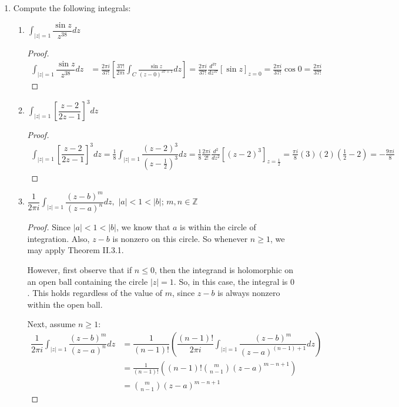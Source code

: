 \documentclass[10pt]{article}
\newcommand{\Z}{\mathbb{Z}}
\newcommand{\R}{\mathbb{R}}
\newcommand{\C}{\mathbb{C}}
\newcommand{\Int}{\displaystyle\int}
\begin{document}
\begin{enumerate}
\begin{proof}
Suppose the range of $f$ is not dense in $\C$.  Then there exist $r \in \R$ and $w \in \C$ such that $|f(z) - w| > r$ for all $z \in \C$.  But then $\frac{1}{f(z) - w}$ is an entire, bounded function (the denominator is always nonzero since $w \not \in f(\C)$, and its modulus is bounded by $r$).  Therefore, $\frac{1}{f(z) - w} = c$ for some nonzero $c \in \C$.  Thus, $f(z) = w + \frac{1}{c}$ is constant.
\end{proof}

\item Compute the following integrals:
\begin{enumerate}
\item $\Int_{|z|=1} \dfrac{\sin z}{z^{38}}dz$
\begin{proof}
\begin{align*}
\Int_{|z|=1} \dfrac{\sin z}{z^{38}}dz
&=
\frac{2\pi i}{37!} \left[ \frac{37!}{2\pi i} \Int_C \frac{\sin z}{(z-0)^{37+1}}dz \right] = \frac{2\pi i}{37!} \frac{d^{37}}{dz^{37}}[\sin z]_{z = 0}
= \frac{2\pi i}{37!} \cos 0 = \frac{2\pi i}{37!}
\end{align*}
\end{proof}
\item $\Int_{|z|=1} \left[ \dfrac{z-2}{2z-1} \right]^3 dz$
\begin{proof}
\begin{align*}
\Int_{|z|=1} \left[ \dfrac{z-2}{2z-1} \right]^3 dz
=
\frac18 \Int_{|z|=1} \dfrac{(z-2)^3}{(z-\frac12)^3} dz
= \frac18 \frac{2\pi i}{2!}\frac{d^2}{dz^2}[(z-2)^3]_{z=\frac12}
= \frac{\pi i}{8}(3)(2)(\frac12 - 2)
= -\frac{9\pi i}{8}
\end{align*}
\end{proof}
\item $\dfrac{1}{2\pi i} \Int_{|z|=1} \dfrac{(z-b)^m}{(z-a)^n}dz,$ $|a|< 1 < |b|$; $m,n \in \Z$
\begin{proof}
Since $|a| < 1 < |b|$, we know that $a$ is within the circle of integration.  Also, $z-b$ is nonzero on this circle.  So whenever $n \geq 1$, we may apply Theorem II.3.1.

However, first observe that if $n \leq 0$, then the integrand is holomorphic on an open ball containing the circle $|z| = 1$.  So, in this case, the integral is $0$.  This holds regardless of the value of $m$, since $z-b$ is always nonzero within the open ball.

Next, assume $n \geq 1$:
\begin{align*}
\dfrac{1}{2\pi i} \Int_{|z|=1} \dfrac{(z-b)^m}{(z-a)^n}dz
&=
\dfrac{1}{(n-1)!}\left(\dfrac{(n-1)!}{2\pi i} \Int_{|z|=1} \dfrac{(z-b)^m}{(z-a)^{(n-1)+1}}dz
\right)
\\
&=
\frac{1}{(n-1)!}\left( (n-1)! \binom{m}{n-1} (z-a)^{m-n+1} \right)
\\
&=
\binom{m}{n-1} (z-a)^{m-n+1}
\end{align*}
\end{proof}
\end{enumerate}


\end{enumerate}
\end{document}
